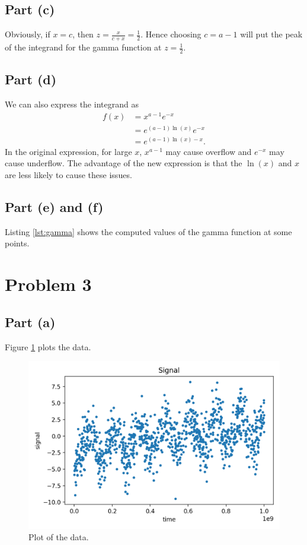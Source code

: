 \documentclass[11pt]{article}
\begin{document}
\subsection{Part (c)}
Obviously, if $x = c$, then $z = \frac{x}{c + x} = \frac{1}{2}$. Hence choosing $c = a-1$ will put the peak of the integrand for the gamma function at $z = \frac{1}{2}$.

\subsection{Part (d)}
We can also express the integrand as
\begin{equation}
\begin{split}
    f(x) & = x^{a-1}e^{-x} \\
    & = e^{(a-1)\ln(x)}e^{-x} \\
    & = e^{(a-1)\ln(x) - x}.
\end{split}
\end{equation}
In the original expression, for large $x$, $x^{a-1}$ may cause overflow and $e^{-x}$ may cause underflow. The advantage of the new expression is that the $\ln(x)$ and $x$ are less likely to cause these issues.

\subsection{Part (e) and (f)}
Listing \ref{lst:gamma} shows the computed values of the gamma function at some points.


\section{Problem 3}
\subsection{Part (a)}
Figure \ref{fig:data} plots the data.
\begin{figure}[H]
    \centering
    \includegraphics[scale = 0.7]{images/ps-5-3a.png}
    \caption{Plot of the data.}
    \label{fig:data}
\end{figure}
\end{document}
